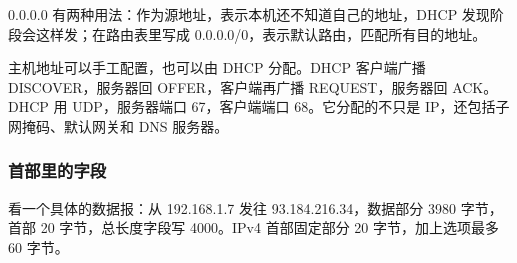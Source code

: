 0.0.0.0 有两种用法：作为源地址，表示本机还不知道自己的地址，DHCP 发现阶段会这样发；在路由表里写成 0.0.0.0/0，表示默认路由，匹配所有目的地址。

主机地址可以手工配置，也可以由 DHCP 分配。DHCP 客户端广播 DISCOVER，服务器回 OFFER，客户端再广播 REQUEST，服务器回 ACK。DHCP 用 UDP，服务器端口 67，客户端端口 68。它分配的不只是 IP，还包括子网掩码、默认网关和 DNS 服务器。

\subsubsection{首部里的字段}

看一个具体的数据报：从 192.168.1.7 发往 93.184.216.34，数据部分 3980 字节，首部 20 字节，总长度字段写 4000。IPv4 首部固定部分 20 字节，加上选项最多 60 字节。

